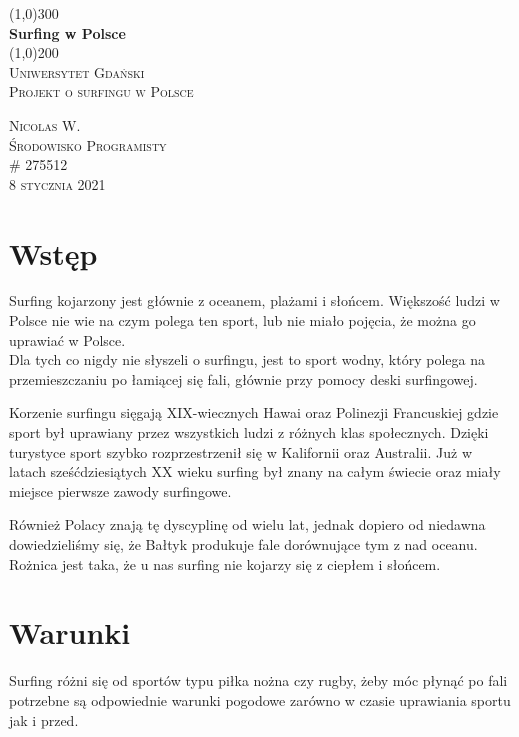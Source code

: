 \documentclass{article}
\begin{document}
\begin{titlepage}
	\begin{center}
	\line(1,0){300} \\
	[0.25in]
	\huge{\bfseries Surfing w Polsce} \\
	[2mm]
	\line(1,0){200} \\
	[1.5cm]
	\textsc{\LARGE Uniwersytet Gdański} \\
	[0.75cm]
	\textsc{\Large Projekt o surfingu w Polsce} \\
	[10cm]
	\end{center}
	\begin{flushright}
	\textsc{\large Nicolas W. \\
	Środowisko Programisty \\ 
	\# 275512 \\
	8 stycznia 2021 \\}
	\end{flushright}
	
	
\end{titlepage} 
\tableofcontents
\thispagestyle{empty}
\cleardoublepage

\setcounter{page}{1}



\section{Wstęp}\label{sec:intro} 
Surfing kojarzony jest głównie z oceanem, plażami i słońcem. Większość ludzi w Polsce  nie wie na czym polega ten sport, lub nie miało pojęcia, że można go uprawiać w Polsce. \\
Dla tych co nigdy nie słyszeli o surfingu, jest to sport wodny, który polega na przemieszczaniu po łamiącej się fali, głównie przy pomocy deski surfingowej.


Korzenie surfingu sięgają XIX-wiecznych Hawai oraz Polinezji Francuskiej gdzie sport był uprawiany przez wszystkich ludzi z różnych klas społecznych. Dzięki turystyce sport szybko rozprzestrzenił się w Kalifornii oraz Australii. Już w latach sześćdziesiątych XX wieku surfing był znany na całym świecie oraz miały miejsce pierwsze zawody surfingowe.


Również Polacy znają tę dyscyplinę od wielu lat, jednak dopiero od niedawna dowiedzieliśmy się, że Bałtyk produkuje fale dorównujące tym z nad oceanu. Rożnica jest taka, że u nas surfing nie kojarzy się z ciepłem i słońcem.

\newpage
\section{Warunki}
Surfing różni się od  sportów typu piłka nożna czy rugby, żeby móc płynąć po fali potrzebne są odpowiednie warunki pogodowe zarówno w czasie uprawiania sportu jak i przed. 
\end{document}
